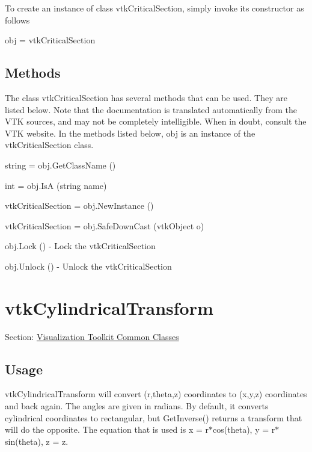 To create an instance of class vtk\-Critical\-Section, simply invoke its constructor as follows \begin{DoxyVerb}  obj = vtkCriticalSection
\end{DoxyVerb}
 \hypertarget{vtkwidgets_vtkxyplotwidget_Methods}{}\subsection{Methods}\label{vtkwidgets_vtkxyplotwidget_Methods}
The class vtk\-Critical\-Section has several methods that can be used. They are listed below. Note that the documentation is translated automatically from the V\-T\-K sources, and may not be completely intelligible. When in doubt, consult the V\-T\-K website. In the methods listed below, {\ttfamily obj} is an instance of the vtk\-Critical\-Section class. 
\begin{DoxyItemize}
\item {\ttfamily string = obj.\-Get\-Class\-Name ()}  
\item {\ttfamily int = obj.\-Is\-A (string name)}  
\item {\ttfamily vtk\-Critical\-Section = obj.\-New\-Instance ()}  
\item {\ttfamily vtk\-Critical\-Section = obj.\-Safe\-Down\-Cast (vtk\-Object o)}  
\item {\ttfamily obj.\-Lock ()} -\/ Lock the vtk\-Critical\-Section  
\item {\ttfamily obj.\-Unlock ()} -\/ Unlock the vtk\-Critical\-Section  
\end{DoxyItemize}\hypertarget{vtkcommon_vtkcylindricaltransform}{}\section{vtk\-Cylindrical\-Transform}\label{vtkcommon_vtkcylindricaltransform}
Section\-: \hyperlink{sec_vtkcommon}{Visualization Toolkit Common Classes} \hypertarget{vtkwidgets_vtkxyplotwidget_Usage}{}\subsection{Usage}\label{vtkwidgets_vtkxyplotwidget_Usage}
vtk\-Cylindrical\-Transform will convert (r,theta,z) coordinates to (x,y,z) coordinates and back again. The angles are given in radians. By default, it converts cylindrical coordinates to rectangular, but Get\-Inverse() returns a transform that will do the opposite. The equation that is used is x = r$\ast$cos(theta), y = r$\ast$sin(theta), z = z.

